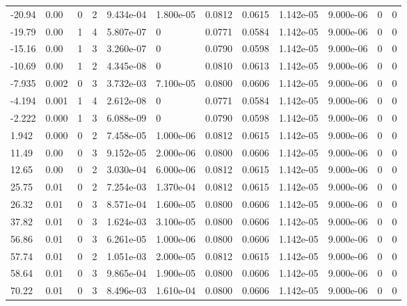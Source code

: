\documentclass[preview]{standalone}
\begin{document}
{{\begin{tabular}{L{1.2cm}C{1.2cm} C{0.3cm}C{0.5cm} C{1.4cm}C{1.4cm} C{1.4cm}C{1.4cm} C{1.6cm}C{1.6cm} C{1.6cm}C{1.6cm}}
  -20.94  &  0.00  & 0     &  2 &  9.434e-04  & 1.800e-05  &  0.0812&   0.0615& 1.142e-05 & 9.000e-06   &  0 & 0  \\ 
  -19.79  &  0.00  & 1     &  4 &  5.807e-07  & 0  &  0.0771&   0.0584& 1.142e-05 & 9.000e-06   &  0 & 0  \\ 
  -15.16  &  0.00  & 1     &  3 &  3.260e-07  & 0  &  0.0790&   0.0598& 1.142e-05 & 9.000e-06   &  0 & 0  \\ 
  -10.69  &  0.00  & 1     &  2 &  4.345e-08  & 0  &  0.0810&   0.0613& 1.142e-05 & 9.000e-06   &  0 & 0  \\ 
  -7.935  &  0.002  & 0     &  3 &  3.732e-03  & 7.100e-05  &  0.0800&   0.0606& 1.142e-05 & 9.000e-06   &  0 & 0  \\ 
  -4.194  &  0.001  & 1     &  4 &  2.612e-08  & 0  &  0.0771&   0.0584& 1.142e-05 & 9.000e-06   &  0 & 0  \\ 
  -2.222  &  0.000  & 1     &  3 &  6.088e-09  & 0  &  0.0790&   0.0598& 1.142e-05 & 9.000e-06   &  0 & 0  \\ 
  1.942  &  0.000  & 0     &  2 &  7.458e-05  & 1.000e-06  &  0.0812&   0.0615& 1.142e-05 & 9.000e-06   &  0 & 0  \\ 
  11.49  &  0.00  & 0     &  3 &  9.152e-05  & 2.000e-06  &  0.0800&   0.0606& 1.142e-05 & 9.000e-06   &  0 & 0  \\ 
  12.65  &  0.00  & 0     &  2 &  3.030e-04  & 6.000e-06  &  0.0812&   0.0615& 1.142e-05 & 9.000e-06   &  0 & 0  \\ 
  25.75  &  0.01  & 0     &  2 &  7.254e-03  & 1.370e-04  &  0.0812&   0.0615& 1.142e-05 & 9.000e-06   &  0 & 0  \\ 
  26.32  &  0.01  & 0     &  3 &  8.571e-04  & 1.600e-05  &  0.0800&   0.0606& 1.142e-05 & 9.000e-06   &  0 & 0  \\ 
  37.82  &  0.01  & 0     &  3 &  1.624e-03  & 3.100e-05  &  0.0800&   0.0606& 1.142e-05 & 9.000e-06   &  0 & 0  \\ 
  56.86  &  0.01  & 0     &  3 &  6.261e-05  & 1.000e-06  &  0.0800&   0.0606& 1.142e-05 & 9.000e-06   &  0 & 0  \\ 
  57.74  &  0.01  & 0     &  2 &  1.051e-03  & 2.000e-05  &  0.0812&   0.0615& 1.142e-05 & 9.000e-06   &  0 & 0  \\ 
  58.64  &  0.01  & 0     &  3 &  9.865e-04  & 1.900e-05  &  0.0800&   0.0606& 1.142e-05 & 9.000e-06   &  0 & 0  \\ 
  70.22  &  0.01  & 0     &  3 &  8.496e-03  & 1.610e-04  &  0.0800&   0.0606& 1.142e-05 & 9.000e-06   &  0 & 0  \\ 

\end{tabular}}}
\end{document}
